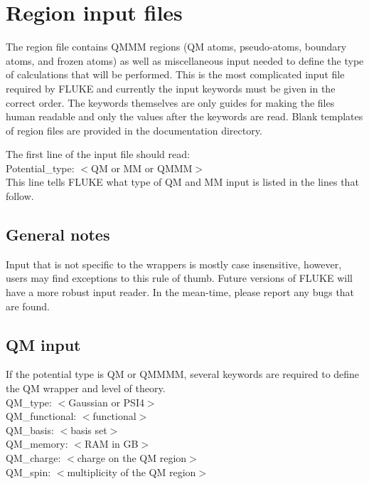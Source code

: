\documentclass[12pt]{report}
\begin{document}
\section{Region input files}

The region file contains QMMM regions (QM atoms, pseudo-atoms, boundary atoms,
and frozen atoms) as well as miscellaneous input needed to define the type
of calculations that will be performed. This is the most complicated input
file required by FLUKE and currently the input keywords must be given in the
correct order. The keywords themselves are only guides for making the files
human readable and only the values after the keywords are read. Blank templates
of region files are provided in the documentation directory.

The first line of the input file should read: \\

Potential\_type: $<$QM or MM or QMMM$>$ \\

This line tells FLUKE what type of QM and MM input is listed in the lines that
follow.

\subsection{General notes}

Input that is not specific to the wrappers is mostly case insensitive,
however, users may find exceptions to this rule of thumb. Future versions of
FLUKE will have a more robust input reader. In the mean-time, please report
any bugs that are found.

\subsection{QM input}

If the potential type is QM or QMMMM, several keywords are required to define
the QM wrapper and level of theory. \\

QM\_type: $<$Gaussian or PSI4$>$ \\
QM\_functional: $<$functional$>$ \\
QM\_basis: $<$basis set$>$ \\
QM\_memory: $<$RAM in GB$>$ \\
QM\_charge: $<$charge on the QM region$>$ \\
QM\_spin: $<$multiplicity of the QM region$>$ \\
\end{document}
